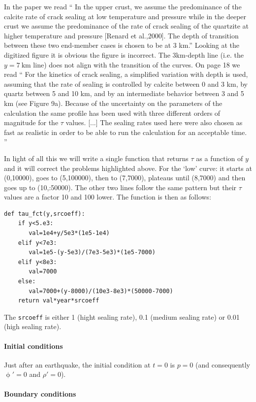 In the paper we read ``
In the upper crust, we assume the predominance of the calcite rate of crack sealing
at low temperature and pressure while in the deeper crust we
assume the predominance of the rate of crack sealing of the
quartzite at higher temperature and pressure [Renard et al.,2000]. 
The depth of transition between these two end-member cases is chosen to be at 3 km.''
Looking at the digitized figure it is obvious the figure is incorrect. The 3km-depth 
line (i.e. the $y=7~\si{\km}$ line) does not align with the transition of the curves.
On page 18 we read ``
For the kinetics of crack sealing, a simplified
variation with depth is used, assuming that the rate of
sealing is controlled by calcite between 0 and 3 km, by
quartz between 5 and 10 km, and by an intermediate
behavior between 3 and 5 km (see Figure 9a). Because of
the uncertainty on the parameters of the calculation the same
profile has been used with three different orders of magnitude 
for the $\tau$ values.
[...] The sealing rates used here were also chosen as fast
as realistic in order to be able to run the calculation for an
acceptable time.
''


In light of all this we will write a single function that returns $\tau$ as a function of $y$
and it will correct the problems highlighted above. 
For the `low' curve: it starts at (0,10000), goes to (5,100000), then to (7,7000), plateaus
until (8,7000) and then goes up to (10,:50000).
The other two lines follow the same pattern but their $\tau$ values are a factor 10 and 100 lower.
The function is then as follows:
\begin{lstlisting}
def tau_fct(y,srcoeff):
    if y<5.e3:
       val=1e4+y/5e3*(1e5-1e4)
    elif y<7e3:
       val=1e5-(y-5e3)/(7e3-5e3)*(1e5-7000)
    elif y<8e3:
       val=7000
    else:
       val=7000+(y-8000)/(10e3-8e3)*(50000-7000)
    return val*year*srcoeff
\end{lstlisting}
The \lstinline{srcoeff} is either 1 (hight sealing rate), 0.1 (medium sealing rate)
or 0.01 (high sealing rate).


\paragraph{Initial conditions}

Just after an earthquake, the initial condition at $t=0$ is $p=0$ (and consequently 
$\upphi'=0$  and $\rho'=0$).

\paragraph{Boundary conditions}

